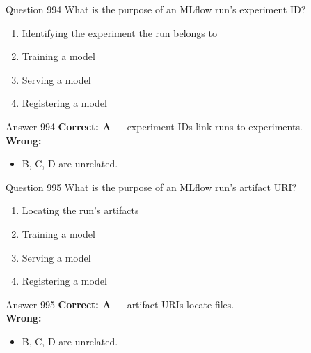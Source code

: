 \documentclass[aspectratio=169,11pt]{beamer}
\begin{document}
	\begin{frame}{Question 994}
		What is the purpose of an MLflow run's experiment ID?
		\begin{enumerate}[label=\Alph*.]
			\item Identifying the experiment the run belongs to
			\item Training a model
			\item Serving a model
			\item Registering a model
		\end{enumerate}
	\end{frame}
	\begin{frame}{Answer 994}
		\textbf{Correct: A} --- experiment IDs link runs to experiments.\\
		\vspace{0.5em}
		\textbf{Wrong:}
		\begin{itemize}
			\item B, C, D are unrelated.
		\end{itemize}
	\end{frame}
	
	\begin{frame}{Question 995}
		What is the purpose of an MLflow run's artifact URI?
		\begin{enumerate}[label=\Alph*.]
			\item Locating the run's artifacts
			\item Training a model
			\item Serving a model
			\item Registering a model
		\end{enumerate}
	\end{frame}
	\begin{frame}{Answer 995}
		\textbf{Correct: A} --- artifact URIs locate files.\\
		\vspace{0.5em}
		\textbf{Wrong:}
		\begin{itemize}
			\item B, C, D are unrelated.
		\end{itemize}
	\end{frame}
	
\end{document}
